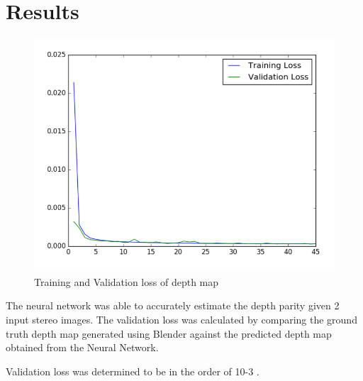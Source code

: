 \section{Results}

\begin{figure}
  \includegraphics[width=\linewidth]{images/validationloss.png}
  \caption{Training and Validation loss of depth map}
  \label{fig:boat1}
\end{figure}

The neural network was able to accurately estimate the depth parity given 2 input stereo images. The validation loss was calculated by comparing the ground truth depth map generated using Blender against the predicted depth map obtained from the Neural Network.

Validation loss was determined to be in the order of 10-3 . 


